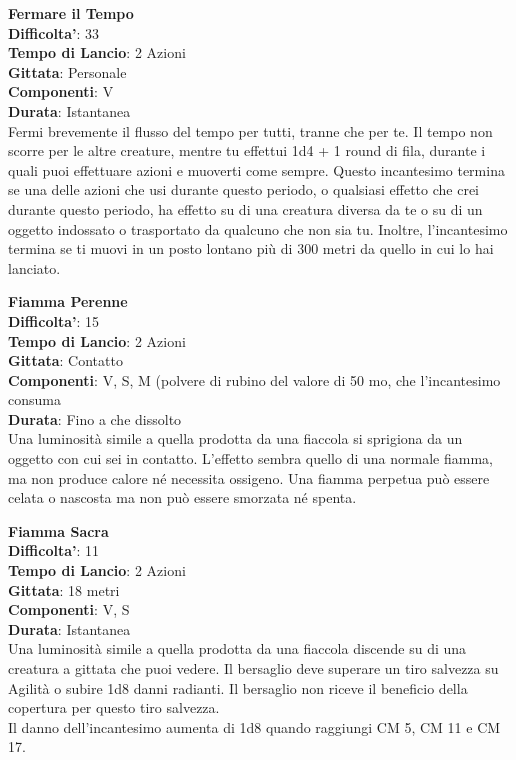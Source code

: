 \begin{multicols}{2}
\medskip\textbf{Fermare il Tempo}\\
\textbf{Difficolta'}: 33\\
\textbf{Tempo di Lancio}: 2 Azioni\\
\textbf{Gittata}: Personale\\
\textbf{Componenti}: V\\
\textbf{Durata}: Istantanea\\
Fermi brevemente il flusso del tempo per tutti, tranne che per te. Il tempo non scorre per le altre creature,  mentre tu effettui 1d4 + 1 round  di fila, durante i quali puoi effettuare azioni e muoverti come sempre. Questo incantesimo termina se una delle azioni che usi durante questo periodo, o qualsiasi effetto che crei durante questo periodo, ha effetto su di una creatura diversa da te o su di un oggetto indossato o trasportato da qualcuno che non sia tu. Inoltre, l’incantesimo termina se ti muovi in un posto lontano più di 300 metri da quello in cui lo hai lanciato.

\medskip\textbf{Fiamma Perenne}\\
\textbf{Difficolta'}: 15\\
\textbf{Tempo di Lancio}: 2 Azioni\\
\textbf{Gittata}: Contatto\\
\textbf{Componenti}: V, S, M (polvere di rubino del valore di 50 mo, che l’incantesimo consuma\\ \textbf{Durata}: Fino a che dissolto\\
Una luminosità simile a quella prodotta da una fiaccola si sprigiona da un oggetto con cui sei in contatto. L’effetto sembra quello di una normale fiamma, ma non produce calore né necessita ossigeno. Una fiamma perpetua può essere celata o nascosta ma non può essere smorzata né spenta.

\medskip\textbf{Fiamma Sacra}\\
\textbf{Difficolta'}: 11\\
\textbf{Tempo di Lancio}: 2 Azioni\\
\textbf{Gittata}: 18 metri\\
\textbf{Componenti}: V, S\\
\textbf{Durata}: Istantanea\\
Una luminosità simile a quella prodotta da una fiaccola discende su di una creatura a gittata che puoi vedere. Il bersaglio deve superare un tiro salvezza su Agilità o subire 1d8 danni radianti. Il bersaglio non riceve il beneficio della copertura per questo tiro salvezza.\\
Il danno dell’incantesimo aumenta di 1d8 quando raggiungi CM 5, CM 11 e CM 17.


\end{multicols}
